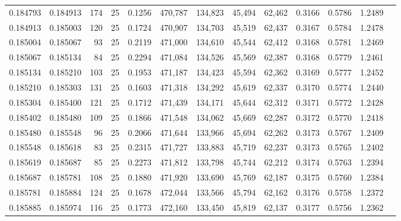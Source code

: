 \begin{tabular}{rrrrrrrrrrrrr}
0.184793 & 0.184913 &   174 &  25 &                                     0.1256 & 470,787 & 134,823 &  45,494 &  62,462 & 0.3166 & 0.5786 & 1.2489 \\
0.184913 & 0.185003 &   120 &  25 &                                     0.1724 & 470,907 & 134,703 &  45,519 &  62,437 & 0.3167 & 0.5784 & 1.2478 \\
0.185004 & 0.185067 &    93 &  25 &                                     0.2119 & 471,000 & 134,610 &  45,544 &  62,412 & 0.3168 & 0.5781 & 1.2469 \\
0.185067 & 0.185134 &    84 &  25 &                                     0.2294 & 471,084 & 134,526 &  45,569 &  62,387 & 0.3168 & 0.5779 & 1.2461 \\
0.185134 & 0.185210 &   103 &  25 &                                     0.1953 & 471,187 & 134,423 &  45,594 &  62,362 & 0.3169 & 0.5777 & 1.2452 \\
0.185210 & 0.185303 &   131 &  25 &                                     0.1603 & 471,318 & 134,292 &  45,619 &  62,337 & 0.3170 & 0.5774 & 1.2440 \\
0.185304 & 0.185400 &   121 &  25 &                                     0.1712 & 471,439 & 134,171 &  45,644 &  62,312 & 0.3171 & 0.5772 & 1.2428 \\
0.185402 & 0.185480 &   109 &  25 &                                     0.1866 & 471,548 & 134,062 &  45,669 &  62,287 & 0.3172 & 0.5770 & 1.2418 \\
0.185480 & 0.185548 &    96 &  25 &                                     0.2066 & 471,644 & 133,966 &  45,694 &  62,262 & 0.3173 & 0.5767 & 1.2409 \\
0.185548 & 0.185618 &    83 &  25 &                                     0.2315 & 471,727 & 133,883 &  45,719 &  62,237 & 0.3173 & 0.5765 & 1.2402 \\
0.185619 & 0.185687 &    85 &  25 &                                     0.2273 & 471,812 & 133,798 &  45,744 &  62,212 & 0.3174 & 0.5763 & 1.2394 \\
0.185687 & 0.185781 &   108 &  25 &                                     0.1880 & 471,920 & 133,690 &  45,769 &  62,187 & 0.3175 & 0.5760 & 1.2384 \\
0.185781 & 0.185884 &   124 &  25 &                                     0.1678 & 472,044 & 133,566 &  45,794 &  62,162 & 0.3176 & 0.5758 & 1.2372 \\
0.185885 & 0.185974 &   116 &  25 &                                     0.1773 & 472,160 & 133,450 &  45,819 &  62,137 & 0.3177 & 0.5756 & 1.2362 \\

\end{tabular}
